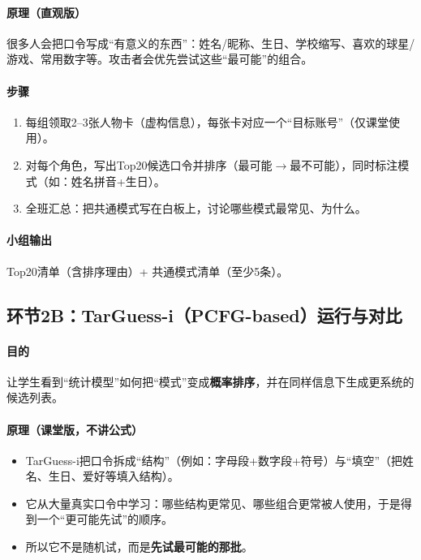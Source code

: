 \documentclass[UTF8,a4paper,12pt]{ctexart}
\begin{document}
\paragraph{原理（直观版）}
很多人会把口令写成``有意义的东西''：姓名/昵称、生日、学校缩写、喜欢的球星/游戏、常用数字等。攻击者会优先尝试这些``最可能''的组合。

\paragraph{步骤}
\begin{enumerate}
  \item 每组领取2--3张人物卡（虚构信息），每张卡对应一个``目标账号''（仅课堂使用）。
  \item 对每个角色，写出Top20候选口令并排序（最可能$\rightarrow$最不可能），同时标注模式（如：姓名拼音+生日）。
  \item 全班汇总：把共通模式写在白板上，讨论哪些模式最常见、为什么。
\end{enumerate}

\paragraph{小组输出}
Top20清单（含排序理由）+ 共通模式清单（至少5条）。

\subsection{环节2B：TarGuess-i（PCFG-based）运行与对比}
\paragraph{目的}
让学生看到``统计模型''如何把``模式''变成\textbf{概率排序}，并在同样信息下生成更系统的候选列表。

\paragraph{原理（课堂版，不讲公式）}
\begin{itemize}
  \item TarGuess-i把口令拆成``结构''（例如：字母段+数字段+符号）与``填空''（把姓名、生日、爱好等填入结构）。
  \item 它从大量真实口令中学习：哪些结构更常见、哪些组合更常被人使用，于是得到一个``更可能先试''的顺序。
  \item 所以它不是随机试，而是\textbf{先试最可能的那批}。
\end{itemize}
\end{document}
